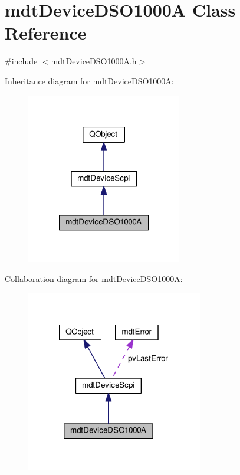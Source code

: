 \hypertarget{classmdt_device_d_s_o1000_a}{\section{mdt\-Device\-D\-S\-O1000\-A Class Reference}
\label{classmdt_device_d_s_o1000_a}
}


{\ttfamily \#include $<$mdt\-Device\-D\-S\-O1000\-A.\-h$>$}



Inheritance diagram for mdt\-Device\-D\-S\-O1000\-A\-:
\nopagebreak
\begin{figure}[H]
\begin{center}
\leavevmode
\includegraphics[width=192pt]{classmdt_device_d_s_o1000_a__inherit__graph}
\end{center}
\end{figure}


Collaboration diagram for mdt\-Device\-D\-S\-O1000\-A\-:
\nopagebreak
\begin{figure}[H]
\begin{center}
\leavevmode
\includegraphics[width=218pt]{classmdt_device_d_s_o1000_a__coll__graph}
\end{center}
\end{figure}

